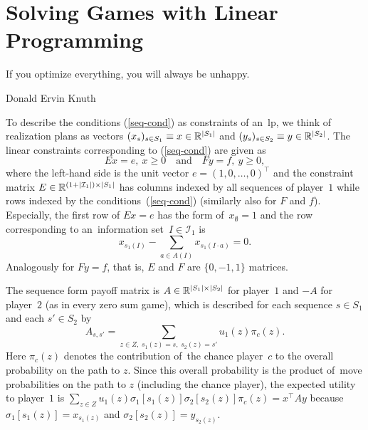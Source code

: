 \section{Solving Games with Linear Programming}
{
  \setlength{\epigraphwidth}{0.65\textwidth}
  \epigraph{
    If you optimize everything, you will always be unhappy.
  }{Donald Ervin Knuth}
}%
To describe the conditions (\ref{seq-cond}) as constraints of an~\acrshort{lp}, we think of realization plans as vectors
$(x_s) _{s\in S_1} \equiv x \in \mathbb{R} ^{\left\vert S_1 \right\vert}$
and
$(y_s) _{s\in S_2} \equiv y \in \mathbb{R} ^{\left\vert S_2 \right\vert}$.
The linear constraints corresponding to (\ref{seq-cond}) are given as
\begin{equation}
\label{seq-constr}
    Ex = e, \ x \ge 0
    \quad \textrm{and} \quad
    Fy = f, \ y \ge 0,
\end{equation}
where the left-hand side is the unit vector $e = (1, 0, \dots, 0) ^\top$ and the constraint matrix
$E \in \mathbb{R} ^{(1 + \left\vert \mathcal{I}_1 \right\vert) \times \left\vert S_1 \right\vert}$
has columns indexed by all sequences of player~$1$ while rows indexed by the conditions~(\ref{seq-cond}) (similarly also for $F$ and $f$).
Especially, the first row of $Ex = e$ has the form of~$x _{\emptyset} = 1$ and the row corresponding to an~information set~$I \in \mathcal{I}_1$ is
\[
    x _{s_1 (I)} - \sum _{a \in A(I)} x _{s_1(I \cdot a)} = 0.
\]
Analogously for $Fy = f$, that is, $E$ and $F$ are $\{0, -1, 1\}$ matrices.

The sequence form payoff matrix is $A \in \mathbb{R} ^{\left\vert S_1 \right\vert \times \left\vert S_2 \right\vert}$ for player~$1$ and $-A$ for player~$2$ (as in every zero sum game), which is described for each sequence $s \in S_1$ and each $s' \in S_2$ by
\[
    A _{s,s'} = \sum _{z \in Z,\; s_1(z) = s,\; s_2(z) = s'} u_1(z) \pi_c (z).
\]
Here $\pi_c (z)$ denotes the contribution of~the chance player~$c$ to the overall probability on the path to $z$.
Since this overall probability is the product of~move probabilities on the path to $z$ (including the chance player), the expected utility to player~$1$ is
$
    \sum _{z \in Z} u_1(z) \sigma_1 [s_1(z)] \sigma_2 [s_2(z)] \pi_c (z)
    = x ^\top A y
$
because $\sigma_1 [s_1(z)] = x _{s_1(z)}$ and $\sigma_2 [s_2(z)] = y _{s_2(z)}$.

